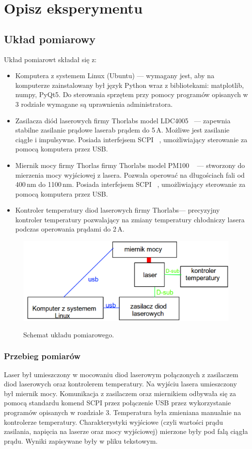 \chapter{Opisz eksperymentu}
\section{Układ pomiarowy}
Układ pomiarowt składał się z:
\begin{itemize}
\item Komputera z systemem Linux (Ubuntu) --- wymagany jest, aby na komputerze zainstalowany był język Python wraz z bibliotekami:
matplotlib, numpy, PyQt5. Do sterowania sprzętem przy pomocy programów opisanych w 3 rodziałe wymagane są uprawnienia administratora.
\item Zasilacza diód laserowych firmy Thorlabs model LDC4005 ~\cite{Ldc_book}--- zapewnia stabilne zasilanie prądowe laserab prądem do 5\,A.
Możliwe jest zasilanie ciągłe i impulsywne. Posiada interfejsem SCPI ~\cite{Ldc_book_prog}, umożliwiający sterowanie za pomocą komputera przez USB.
\item Miernik mocy firmy Thorlas firmy Thorlabs model PM100 ~\cite{Pm100_book} --- stworzony do mierzenia mocy wyjściowej z lasera. Pozwala operować na
długościach fali od 400\,nm do 1100\,nm. Posiada interfejsem SCPI ~\cite{Pm100_book}, umożliwiający sterowanie za pomocą komputera przez USB.
\item Kontroler temperatury diod laserowych firmy Thorlabs--- precyzyjny kontroler temperatury pozwalający na zmiany temperatury
chłodniczy lasera podczas operowania prądami do 2\,A.
\end{itemize}
\begin{figure}
\center
  \includegraphics[scale=0.35]{schemat.eps}
  \label{rys1}
  \caption{Schemat układu pomiarowego.}
\end{figure}
\subsection{Przebieg pomiarów}
Laser był umieszczony w mocowaniu diod laserowym połączonych z zasilaczem diod laserowych oraz kontrolerem temperatury.
Na wyjściu lasera umieszczony był miernik mocy. Komunikacja z zasilaczem oraz miernikiem odbywała się za pomocą standardu
komend SCPI przez połączenie USB przez wykorzystanie programów opisanych w rozdziale 3.
Temperatura była zmieniana manualnie na kontrolerze temperatury.
Charakterystyki wyjściowe (czyli wartości prądu zasilania, napięcia na laserze oraz mocy wyjściowej)
mierzone były pod falą ciągła prądu. Wyniki zapisywane były w pliku tekstowym.